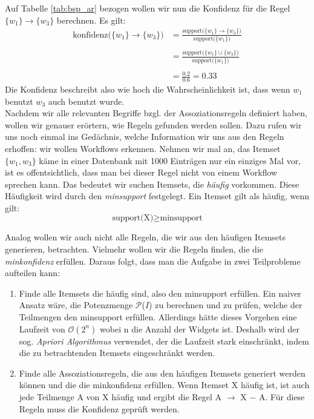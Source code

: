 Auf Tabelle \ref{tab:bsp_ar} bezogen wollen wir nun die Konfidenz für die Regel $\{w_1\} \rightarrow \{w_3\}$ berechnen. Es gilt:\\
\begin{align*}
	\text{konfidenz($\{w_1\} \rightarrow \{w_3\}$)} &= \frac{\text{support($\{w_1\} \rightarrow \{w_3\}$)}}{\text{support($\{w_1\}$)}}\\ \\
	&= \frac{\text{support($\{w_1\} \cup \{w_3\}$)}}{\text{support($\{w_1\}$)}}\\ \\
	&= \frac{0.2}{0.6} = 0.33
\end{align*}
Die Konfidenz beschreibt also wie hoch die Wahrscheinlichkeit ist, dass wenn $w_1$ benutzt $w_3$ auch benutzt wurde. \citep{BeKe19}\\

Nachdem wir alle relevanten Begriffe bzgl. der Assoziationsregeln definiert haben, wollen wir genauer erörtern, wie Regeln gefunden werden sollen. Dazu rufen wir uns noch einmal ins Gedächnis, welche Information wir uns aus den Regeln erhoffen: wir wollen Workflows erkennen. Nehmen wir mal an, das Itemset $\{w_1,w_3\}$ käme in einer Datenbank mit 1000 Einträgen nur ein einziges Mal vor, ist es offentsichtlich, dass man bei dieser Regel nicht von einem Workflow sprechen kann. Das bedeutet wir suchen Itemsets, die \textit{häufig} vorkommen. Diese Häufigkeit wird durch den \textit{minsupport} festgelegt. Ein Itemset gilt als häufig, wenn gilt:\\
\begin{equation*}
	\text{support(X)} \geq \text{minsupport}
\end{equation*}

Analog wollen wir auch nicht alle Regeln, die wir aus den häufigen Itemsets generieren, betrachten. Vielmehr wollen wir die Regeln finden, die die \textit{minkonfidenz} erfüllen. Daraus folgt, dass man die Aufgabe in zwei Teilprobleme aufteilen kann:
\begin{enumerate}
	\item Finde alle Itemsets die häufig sind, also den minsupport erfüllen. Ein naiver Ansatz wäre, die Potenzmenge $\mathcal{P}$($I$) zu berechnen und zu prüfen, welche der Teilmengen den minsupport erfüllen. Allerdings hätte dieses Vorgehen eine Laufzeit von $\mathcal{O}(2^n)$ wobei n die Anzahl der Widgets ist. Deshalb wird der sog. \textit{Apriori Algorithmus} verwendet, der die Laufzeit stark einschränkt, indem die zu betrachtenden Itemsets eingeschränkt werden.\\
	\item Finde alle Assoziationsregeln, die aus den häufigen Itemsets generiert werden können und die die minkonfidenz erfüllen. Wenn Itemset X häufig ist, ist auch jede Teilmenge A von X häufig und ergibt die Regel A $\rightarrow$ X $-$ A. Für diese Regeln muss die Konfidenz geprüft werden.
\end{enumerate}

